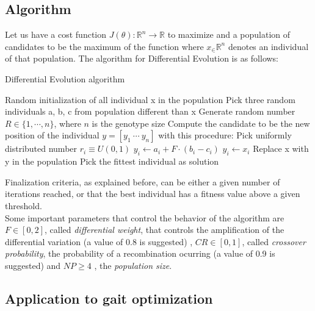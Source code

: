 \subsection{Algorithm}
\label{evolution_algorithm}

Let us have a cost function $J(\theta): \mathbb{R}^n \rightarrow \mathbb{R}$ to maximize and a population of candidates to be the maximum of the function where $x_ \in \mathbb{R}^n$ denotes an individual of that population. The algorithm for Differential Evolution is as follows:\\

\begin{algorithm}
\caption{Differential Evolution algorithm}\label{DE_algorithm}
\begin{algorithmic}[1]
\State Random initialization of all individual x in the population
	\State Pick three random individuals a, b, c from population different than x
	\State Generate random number $ R \in \{1, \cdots, n\}$, where $n$ is the genotype size
	\State Compute the candidate to be the new position of the individual $y = [ y_1 ~ \cdots ~ y_n ]$ with this procedure:
		\State Pick uniformly distributed number $r_i \equiv U(0, 1)$
		\State $y_i \gets a_i + F \cdot (b_i-c_i)$
		\Else
		\State $y_i \gets x_i$ 
		\EndIf
	\EndFor
		\State Replace x with y in the population
	\EndIf
\EndFor
\EndWhile
\State Pick the fittest individual as solution
\end{algorithmic}
\end{algorithm}

Finalization criteria, as explained before, can be either a given number of iterations reached, or that the best individual has a fitness value above a given threshold.\\

Some important parameters that control the behavior of the algorithm are $F \in [0, 2]$, called \emph{differential weight}, that controls the amplification of the differential variation (a value of 0.8 is suggested) , $CR \in [0, 1]$, called \emph{crossover probability}, the probability of a recombination ocurring (a value of 0.9 is suggested) and $NP \geq 4$ , the \emph{population size}.


\subsection{Application to gait optimization}
\label{evolution_gait_opt}

